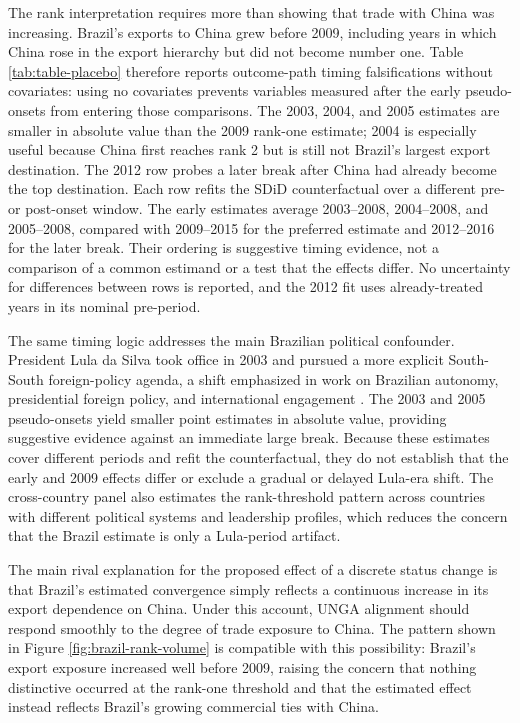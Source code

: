 \documentclass[referee,pdflatex,sn-basic]{sn-jnl}
\theoremstyle{thmstylethree}
\begin{document}
The rank interpretation requires more than showing that trade with China was increasing. Brazil's exports to China grew before 2009, including years in which China rose in the export hierarchy but did not become number one. Table \ref{tab:table-placebo} therefore reports outcome-path timing falsifications without covariates: using no covariates prevents variables measured after the early pseudo-onsets from entering those comparisons. The 2003, 2004, and 2005 estimates are smaller in absolute value than the 2009 rank-one estimate; 2004 is especially useful because China first reaches rank 2 but is still not Brazil's largest export destination. The 2012 row probes a later break after China had already become the top destination. Each row refits the SDiD counterfactual over a different pre- or post-onset window. The early estimates average 2003--2008, 2004--2008, and 2005--2008, compared with 2009--2015 for the preferred estimate and 2012--2016 for the later break. Their ordering is suggestive timing evidence, not a comparison of a common estimand or a test that the effects differ. No uncertainty for differences between rows is reported, and the 2012 fit uses already-treated years in its nominal pre-period.

The same timing logic addresses the main Brazilian political confounder. President Lula da Silva took office in 2003 and pursued a more explicit South-South foreign-policy agenda, a shift emphasized in work on Brazilian autonomy, presidential foreign policy, and international engagement \citep{neto2011, mouron_urdinez2014, neto_malamud2015, rodrigues2019measuring, schenoniMythsMultipolaritySources2022}. The 2003 and 2005 pseudo-onsets yield smaller point estimates in absolute value, providing suggestive evidence against an immediate large break. Because these estimates cover different periods and refit the counterfactual, they do not establish that the early and 2009 effects differ or exclude a gradual or delayed Lula-era shift. The cross-country panel also estimates the rank-threshold pattern across countries with different political systems and leadership profiles, which reduces the concern that the Brazil estimate is only a Lula-period artifact.

The main rival explanation for the proposed effect of a discrete status change is that Brazil's estimated convergence simply reflects a continuous increase in its export dependence on China. Under this account, UNGA alignment should respond smoothly to the degree of trade exposure to China. The pattern shown in Figure \ref{fig:brazil-rank-volume} is compatible with this possibility: Brazil's export exposure increased well before 2009, raising the concern that nothing distinctive occurred at the rank-one threshold and that the estimated effect instead reflects Brazil's growing commercial ties with China.
\end{document}
